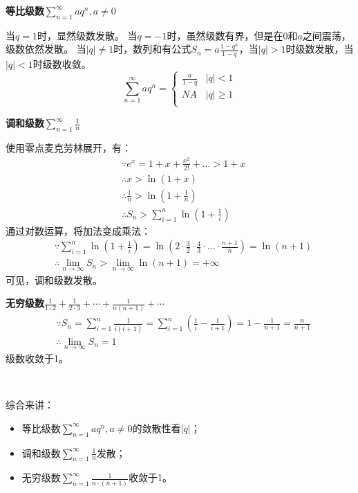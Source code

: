 {\bf 等比级数$\sum_{n=1}^{\infty}{aq^n},a\ne 0$}

当$q=1$时，显然级数发散。
当$q=-1$时，虽然级数有界，但是在0和$a$之间震荡，级数依然发散。
当$\left| q \right|\ne 1$时，数列和有公式$S_n=a\frac{1-q^n}{1-q}$，当$\left| q \right|>1$时级数发散，当$\left| q \right|<1$时级数收敛。
\[
\sum_{n=1}^{\infty}{aq^n}=\begin{cases}
	\frac{a}{1-q} & \left| q \right|<1\\
	NA & \left| q \right|\geqslant 1\\
\end{cases}
\]

{\bf 调和级数$\sum_{n=1}^{\infty}{\frac{1}{n}}$}

使用零点麦克劳林展开，有：
\begin{align*}
&\because e^x=1+x+\frac{x^2}{2!}+...>1+x \\
&\therefore x>\ln \left( 1+x \right) \\
&\therefore \frac{1}{n}>\ln \left( 1+\frac{1}{n} \right) \\
&\therefore S_n>\sum_{i=1}^n{\ln \left( 1+\frac{1}{i} \right)}
\end{align*}
通过对数运算，将加法变成乘法：
\begin{align*}
&\because \sum_{i=1}^n{\ln \left( 1+\frac{1}{i} \right)}=\ln \left( 2\cdot \frac{3}{2}\cdot \frac{4}{3}\cdot ...\cdot \frac{n+1}{n} \right) =\ln \left( n+1 \right) \\
&\therefore \underset{n\rightarrow \infty}{\lim}S_n>\underset{n\rightarrow \infty}{\lim}\ln \left( n+1 \right) =+\infty
\end{align*}
可见，调和级数发散。

{\bf 无穷级数$\frac{1}{1\cdot 2}+\frac{1}{2\cdot 3}+\cdots +\frac{1}{n\left( n+1 \right)}+\cdots $}
\begin{align*}
&\because S_n=\sum_{i=1}^n{\frac{1}{i\left( i+1 \right)}}=\sum_{i=1}^n{\left( \frac{1}{i}-\frac{1}{i+1} \right)}=1-\frac{1}{n+1}=\frac{n}{n+1} \\
&\therefore \underset{n\rightarrow \infty}{\lim}S_n=1
\end{align*}
级数收敛于1。

~

综合来讲：
\begin{itemize}
    \item 等比级数$\sum_{n=1}^{\infty}{aq^n},a\ne 0$的敛散性看$\left| q \right|$；
    \item 调和级数$\sum_{n=1}^{\infty}{\frac{1}{n}}$发散；
    \item 无穷级数$\sum_{n=1}^{\infty}{\frac{1}{n\cdot \left( n+1 \right)}}$收敛于1。
\end{itemize}




